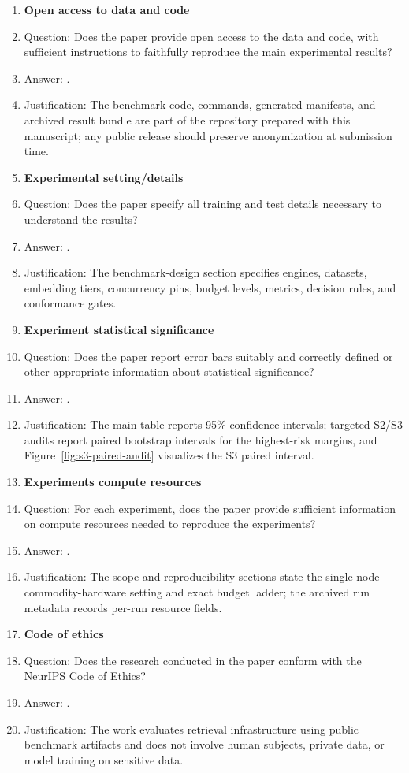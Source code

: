 \begin{enumerate}
\item {\bf Open access to data and code}
    \item[] Question: Does the paper provide open access to the data and code, with sufficient instructions to faithfully reproduce the main experimental results?
    \item[] Answer: \answerYes{}.
    \item[] Justification: The benchmark code, commands, generated manifests, and archived result bundle are part of the repository prepared with this manuscript; any public release should preserve anonymization at submission time.

\item {\bf Experimental setting/details}
    \item[] Question: Does the paper specify all training and test details necessary to understand the results?
    \item[] Answer: \answerYes{}.
    \item[] Justification: The benchmark-design section specifies engines, datasets, embedding tiers, concurrency pins, budget levels, metrics, decision rules, and conformance gates.

\item {\bf Experiment statistical significance}
    \item[] Question: Does the paper report error bars suitably and correctly defined or other appropriate information about statistical significance?
    \item[] Answer: \answerYes{}.
    \item[] Justification: The main table reports 95\% confidence intervals; targeted S2/S3 audits report paired bootstrap intervals for the highest-risk margins, and Figure~\ref{fig:s3-paired-audit} visualizes the S3 paired interval.

\item {\bf Experiments compute resources}
    \item[] Question: For each experiment, does the paper provide sufficient information on compute resources needed to reproduce the experiments?
    \item[] Answer: \answerYes{}.
    \item[] Justification: The scope and reproducibility sections state the single-node commodity-hardware setting and exact budget ladder; the archived run metadata records per-run resource fields.

\item {\bf Code of ethics}
    \item[] Question: Does the research conducted in the paper conform with the NeurIPS Code of Ethics?
    \item[] Answer: \answerYes{}.
    \item[] Justification: The work evaluates retrieval infrastructure using public benchmark artifacts and does not involve human subjects, private data, or model training on sensitive data.


\end{enumerate}

